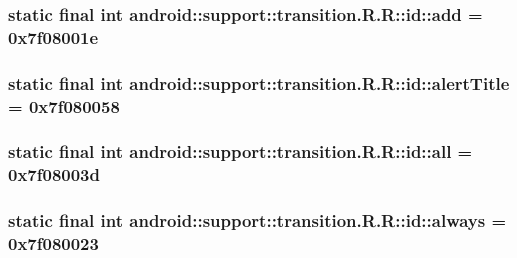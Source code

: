 \hypertarget{classandroid_1_1support_1_1transition_1_1_r_1_1id_fba1a54ddad759d959557317dc810bf3}{
\subsubsection[{add}]{\setlength{\rightskip}{0pt plus 5cm}static final int android::support::transition.R.R::id::add = 0x7f08001e}}
\label{classandroid_1_1support_1_1transition_1_1_r_1_1id_fba1a54ddad759d959557317dc810bf3}


\hypertarget{classandroid_1_1support_1_1transition_1_1_r_1_1id_92b0f08f712a7f1b2e1f668900970bb6}{
\subsubsection[{alertTitle}]{\setlength{\rightskip}{0pt plus 5cm}static final int android::support::transition.R.R::id::alertTitle = 0x7f080058}}
\label{classandroid_1_1support_1_1transition_1_1_r_1_1id_92b0f08f712a7f1b2e1f668900970bb6}


\hypertarget{classandroid_1_1support_1_1transition_1_1_r_1_1id_27849bb1c4ef713593c2736e51b29d5d}{
\subsubsection[{all}]{\setlength{\rightskip}{0pt plus 5cm}static final int android::support::transition.R.R::id::all = 0x7f08003d}}
\label{classandroid_1_1support_1_1transition_1_1_r_1_1id_27849bb1c4ef713593c2736e51b29d5d}


\hypertarget{classandroid_1_1support_1_1transition_1_1_r_1_1id_ef0d215ec3ae43a64e121916c1dd0438}{
\subsubsection[{always}]{\setlength{\rightskip}{0pt plus 5cm}static final int android::support::transition.R.R::id::always = 0x7f080023}}
\label{classandroid_1_1support_1_1transition_1_1_r_1_1id_ef0d215ec3ae43a64e121916c1dd0438}


